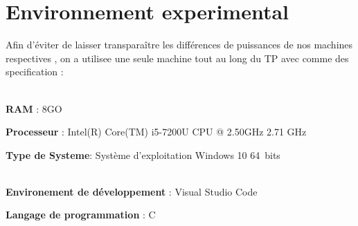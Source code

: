 \chapter{Environnement experimental}
 Afin d'éviter de laisser transparaître les différences de puissances de nos machines respectives , on a utilisee une seule machine tout au long du TP avec comme des specification : 
\par
\\ 
\textbf{RAM} : 8GO
\\
\par
\textbf{Processeur} : Intel(R) Core(TM) i5-7200U CPU @ 2.50GHz   2.71 GHz
\\
\par

\textbf{Type de Systeme}: Système d’exploitation Windows 10
64 bits
\\
\par
\\
\textbf{Environement de développement} : Visual Studio Code
\\
\par
\textbf{Langage de programmation} : C